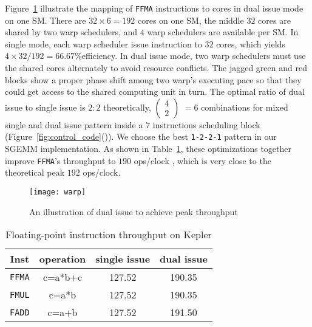Figure~\ref{fig:warp} illustrate the mapping of {\tt FFMA} instructions to cores in dual issue mode on one SM. There are $32\times 6=192$ cores on
one SM, the middle $32$ cores are shared by two warp schedulers, and $4$ warp schedulers are available per SM. 
In single mode, each warp scheduler issue instruction to $32$ cores, which
yields $4\times32/192=66.67\%$efficiency. 
In dual issue mode, two warp schedulers must use the shared cores alternately to avoid resource conflicts.
The jagged green and red blocks show a proper phase shift among two warp's executing pace so that they could get
access to the shared computing unit in turn.
The optimal ratio of dual issue to single issue is $2:2$ theoretically, 
\( \begin{pmatrix} 4 \\ 2 \end{pmatrix} \) $=6$ combinations for mixed single and dual issue
pattern inside a $7$ instructions scheduling block (Figure~\ref{fig:control_code}()).
We choose the best {\tt 1-2-2-1} pattern in our SGEMM implementation.
As shown in Table~\ref{tab:ffma}, these optimizations together improve {\tt FFMA}'s throughput to $190$ ops/clock
, which is very close to the theoretical peak $192$ ops/clock.
\begin{figure}[htbp]
\begin{center}
\texttt{[image: warp]}
    \caption{An illustration of dual issue to achieve peak throughput}
\label{fig:warp}
\end{center}
\end{figure}

\begin{table}[htbp]
\caption{Floating-point instruction throughput on Kepler}
\centering
\scalebox{0.9} {
\begin{tabular}{|c|c|c|c|}
\hline
Inst &operation&single issue&dual issue\\
\hline
{\tt FFMA} &c=a*b+c&127.52&190.35 \\
\hline
{\tt FMUL} &c=a*b&127.52&190.35 \\
\hline
{\tt FADD} &c=a+b&127.52&191.50\\
\hline
\end{tabular}
}
\label{tab:ffma}
\end{table}

